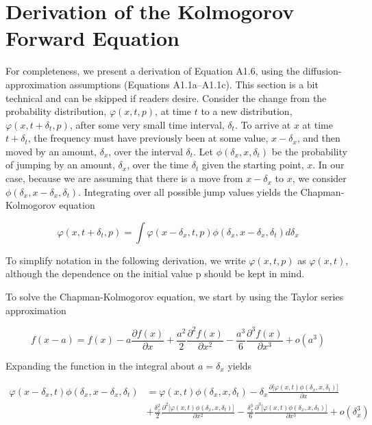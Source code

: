 \documentclass{article}
\begin{document}
\section{Derivation of the Kolmogorov Forward Equation}
For completeness, we present a derivation of Equation A1.6, using the diffusion-approximation assumptions (Equations A1.1a–A1.1c). This section is a bit technical and can be skipped if readers desire. Consider the change from the probability distribution,  $ \varphi(x, t, p) $, at time  $ t $ to a new distribution,  $ \varphi(x, t + \delta_t, p) $, after some very small time interval,  $ \delta_t $. To arrive at  $ x $ at time  $ t + \delta_t $, the frequency must have previously been at some value,  $ x - \delta_x $, and then moved by an amount,  $ \delta_x $, over the interval  $ \delta_t $. Let  $ \phi(\delta_x, x, \delta_t) $ be the probability of jumping by an amount,  $ \delta_x $, over the time  $ \delta_t $ given the starting point,  $ x $. In our case, because we are assuming that there is a move from  $ x - \delta_x $ to  $ x $, we consider  $ \phi(\delta_x, x - \delta_x, \delta_t) $. Integrating over all possible jump values yields the Chapman-Kolmogorov equation

\begin{equation}
\varphi(x,t+\delta_{t},p)=\int\varphi(x-\delta_{x},t,p)\phi(\delta_{x},x-\delta_{x},\delta_{t})d\delta_{x}
\end{equation}

To simplify notation in the following derivation, we write  $ \varphi(x,t,p) $ as  $ \varphi(x,t) $, although the dependence on the initial value p should be kept in mind.

To solve the Chapman-Kolmogorov equation, we start by using the Taylor series approximation

\begin{equation}
f(x-a)=f(x)-a\frac{\partial f(x)}{\partial x}+\frac{a^{2}}{2}\frac{\partial^{2}f(x)}{\partial x^{2}}-\frac{a^{3}}{6}\frac{\partial^{3}f(x)}{\partial x^{3}}+o(a^{3})
\end{equation}

Expanding the function in the integral about  $ a = \delta_{x} $ yields

\begin{equation}
\begin{align*}\varphi(x-\delta_{x},t)\phi(\delta_{x},x-\delta_{x},\delta_{t})&=\varphi(x,t)\phi(\delta_{x},x,\delta_{t})-\delta_{x}\frac{\partial\big[\varphi(x,t)\phi(\delta_{x},x,\delta_{t})\big]}{\partial x}\\&+\frac{\delta_{x}^{2}}{2}\frac{\partial^{2}\big[\varphi(x,t)\phi(\delta_{x},x,\delta_{t})\big]}{\partial x^{2}}-\frac{\delta_{x}^{3}}{6}\frac{\partial^{3}\big[\varphi(x,t)\phi(\delta_{x},x,\delta_{t})\big]}{\partial x^{3}}+o(\delta_{x}^{3})\end{align*}
\end{equation}
\end{document}

